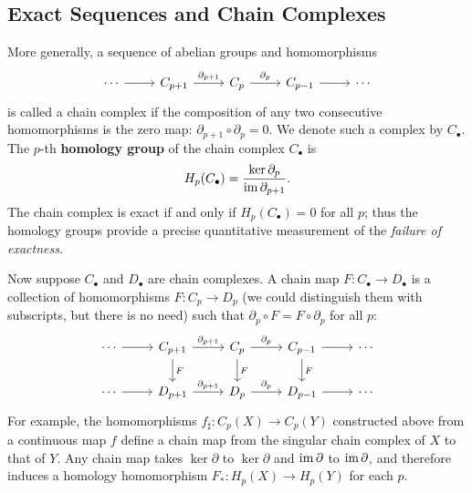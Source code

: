 \subsection{Exact Sequences and Chain Complexes}
More generally, a sequence of abelian groups and homomorphisms
\[\begin{tikzcd}
\cdots\ar[r]&C_{p+1}\ar[r,"\partial_{p+1}"]&C_p\ar[r,"\partial_p"]&C_{p-1}\ar[r]&\cdots
\end{tikzcd}\]
is called a chain complex if the composition of any two consecutive homomorphisms is the zero map: $\partial_{p+1}\circ\partial_p=0$. We denote such a complex by $C_\bullet$. The $p$-th \textbf{homology group} of the chain complex $C_\bullet$ is
\[H_p(C_\bullet)=\dfrac{\mathrm{ker}\,\partial_{p}}{\mathrm{im}\,\partial_{p+1}}.\]
The chain complex is exact if and only if $H_p(C_\bullet)=0$ for all $p$; thus the homology groups provide a precise quantitative measurement of the \textit{failure of exactness}.\par
Now suppose $C_\bullet$ and $D_\bullet$ are chain complexes. A chain map $F:C_\bullet\to D_\bullet$ is a collection of homomorphisms $F:C_p\to D_p$ (we could distinguish them with subscripts, but there is no need) such that $\partial_p\circ F=F\circ\partial_p$ for all $p$:
\[\begin{tikzcd}
\cdots\ar[r]&C_{p+1}\ar[d,"F"]\ar[r,"\partial_{p+1}"]&C_p\ar[d,"F"]\ar[r,"\partial_p"]&C_{p-1}\ar[d,"F"]\ar[r]&\cdots\\
\cdots\ar[r]&D_{p+1}\ar[r,"\partial_{p+1}"]&D_p\ar[r,"\partial_p"]&D_{p-1}\ar[r]&\cdots
\end{tikzcd}\]
For example, the homomorphisms $f_\sharp:C_p(X)\to C_p(Y)$ constructed above from a continuous map $f$ define a chain map from the singular chain complex of $X$ to that of $Y$. Any chain map takes $\ker\partial$ to $\ker\partial$ and $\mathrm{im}\,\partial$ to $\mathrm{im}\,\partial$, and therefore induces a homology homomorphism $F_*:H_p(X)\to H_p(Y)$ for each $p$.
